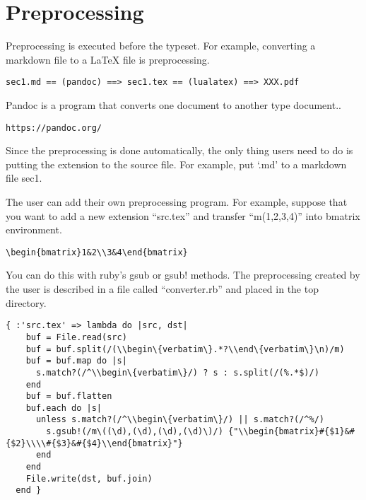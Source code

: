 
\section{Preprocessing}

Preprocessing is executed before the typeset. For example, converting a
markdown file to a LaTeX file is preprocessing.

\begin{verbatim}
sec1.md == (pandoc) ==> sec1.tex == (lualatex) ==> XXX.pdf
\end{verbatim}

Pandoc is a program that converts one document to another type
document..

\begin{verbatim}
https://pandoc.org/
\end{verbatim}

Since the preprocessing is done automatically, the only thing users need
to do is putting the extension to the source file. For example, put
`.md' to a markdown file sec1.

The user can add their own preprocessing program. For example, suppose
that you want to add a new extension ``src.tex'' and transfer
``m(1,2,3,4)'' into bmatrix environment.

\begin{verbatim}
\begin{bmatrix}1&2\\3&4\end{bmatrix}
\end{verbatim}

You can do this with ruby's gsub or gsub! methods. The preprocessing
created by the user is described in a file called ``converter.rb'' and
placed in the top directory.

\begin{verbatim}
{ :'src.tex' => lambda do |src, dst|
    buf = File.read(src)
    buf = buf.split(/(\\begin\{verbatim\}.*?\\end\{verbatim\}\n)/m)
    buf = buf.map do |s|
      s.match?(/^\\begin\{verbatim\}/) ? s : s.split(/(%.*$)/)
    end
    buf = buf.flatten
    buf.each do |s|
      unless s.match?(/^\\begin\{verbatim\}/) || s.match?(/^%/)
        s.gsub!(/m\((\d),(\d),(\d),(\d)\)/) {"\\begin{bmatrix}#{$1}&#{$2}\\\\#{$3}&#{$4}\\end{bmatrix}"}
      end
    end
    File.write(dst, buf.join)
  end }
\end{verbatim}


